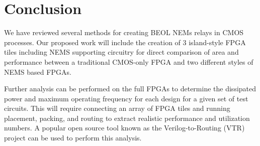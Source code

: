 \documentclass[twoside,twocolumn]{article}
\begin{document}
\section{Conclusion}
We have reviewed several methods for creating BEOL NEMs relays in CMOS processes. 
Our proposed work will include the creation of 3 island-style FPGA tiles including NEMS 
supporting circuitry for direct comparison of area and performance between a traditional 
CMOS-only FPGA and two different styles of NEMS based FPGAs.

 Further analysis can be performed 
on the full FPGAs to determine the dissipated power and maximum 
operating frequency for each design for a given set of test circuits.
This will require connecting an array of FPGA tiles and running 
placement, packing, and routing to extract realistic performance and
utilization numbers. A popular open source tool known as the Verilog-to-Routing 
(VTR) project \cite{vtr8} can be used to perform this analysis.  



\printbibliography

\end{document}
